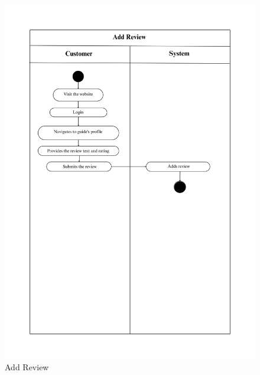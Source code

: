 \begin{figure}[h]
    \centering
    \includegraphics[width=1\textwidth]{Images/Activity Diagrams/27 Add Review.png}
    \caption{Add Review}
    \label{fig:activity-add-review}
\end{figure}

